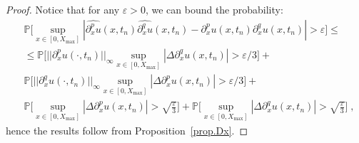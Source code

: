 \documentclass[a4paper,11pt]{article}
\newtheorem{thm}{Theorem}[section]
\begin{document}
\begin{proof}
Notice that for any $\varepsilon>0$, we can bound the probability:
\begin{align*}
&\mathbb{P}\Big[\sup_{x\in[0,X_{\max}]}|\widehat{\partial_x^pu}(x,t_n)\widehat{\partial_x^qu}(x,t_n)-\partial_x^pu(x,t_n)\partial_x^qu(x,t_n)|>\varepsilon\Big]\leq\\
&\leq\mathbb{P}\Big[||\partial_x^pu(\cdot,t_n)||_{\infty}\sup_{x\in[0,X_{\max}]}|\Delta\partial_x^qu(x,t_n)|>\varepsilon/3\Big]+\\
&\mathbb{P}\Big[||\partial_x^qu(\cdot,t_n)||_{\infty}\sup_{x\in[0,X_{\max}]}|\Delta\partial_x^pu(x,t_n)|>\varepsilon/3\Big]+\\
&\mathbb{P}\Big[\sup_{x\in[0,X_{\max}]}|\Delta\partial_x^pu(x,t_n)|>\sqrt{\frac{\varepsilon}{3}}\Big]+\mathbb{P}\Big[\sup_{x\in[0,X_{\max}]}|\Delta\partial_x^qu(x,t_n)|>\sqrt{\frac{\varepsilon}{3}}\Big]\;,
\end{align*}
hence the results follow from Proposition~\ref{prop.Dx}.
\end{proof}
%
%
%
\end{document}

